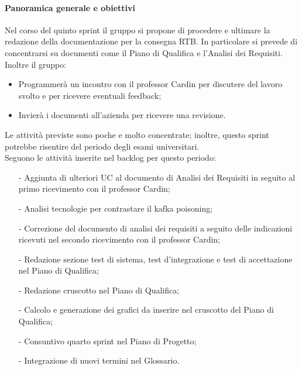 \documentclass[10pt]{article}
\begin{document}
{{{{{{    \paragraph{Panoramica generale e obiettivi}\mbox{}\vspace{0.4em}

    Nel corso del quinto sprint il gruppo si propone di procedere e ultimare la redazione della documentazione per la consegna RTB.
    In particolare si prevede di concentrarsi su documenti come il Piano di Qualifica e l'Analisi dei Requisiti.\\
    Inoltre il gruppo:
    \begin{itemize}
        \item Programmerà un incontro con il professor Cardin per discutere del lavoro svolto e per ricevere eventuali feedback;
        \item Invierà i documenti all'azienda per ricevere una revisione.
    \end{itemize}
    Le attività previste sono poche e molto concentrate; inoltre, questo sprint potrebbe risentire del periodo degli esami universitari.\\

    Seguono le attività inserite nel backlog per questo periodo:
    \vspace{-0.5em}
    \begin{itemize}
    \setlength\itemsep{-0.2em}
    \item [-] Aggiunta di ulteriori UC al documento di Analisi dei Requisiti in seguito al primo ricevimento con il professor Cardin;
    \item [-] Analisi tecnologie per contrastare il kafka poisoning;
    \item [-] Correzione del documento di analisi dei requisiti a seguito delle indicazioni ricevuti nel secondo ricevimento con il professor Cardin;
    \item [-] Redazione sezione test di sistema, test d'integrazione e test di accettazione nel Piano di Qualifica;
    \item [-] Redazione cruscotto nel Piano di Qualifica;
    \item [-] Calcolo e generazione dei grafici da inserire nel cruscotto del Piano di Qualifica;
    \item [-] Consuntivo quarto sprint nel Piano di Progetto;
    \item [-] Integrazione di nuovi termini nel Glossario.
    \end{itemize}

}}}}}}
\end{document}
